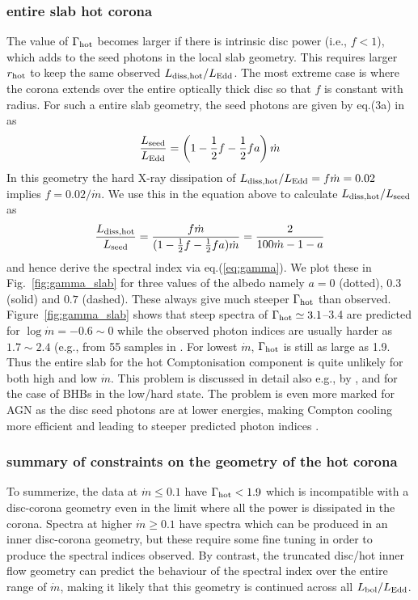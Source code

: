 \documentclass[a4paper,fleqn,usenatbib]{mnras}
\begin{document}
\subsubsection{entire slab hot corona}
The value of $\Gamma_{\rm hot}$ becomes larger if there is  intrinsic disc power (i.e., $f<1$), which adds to the seed photons
in the local slab geometry. This requires larger 
$r_{\rm hot}$  to keep the same 
observed $L_{\rm diss, hot}/L_{\rm Edd}$.%
The most extreme case is where the corona extends over the entire optically thick disc
so that $f$ is constant with radius. 
For such a entire slab geometry, 
the seed photons are given by  eq.(3a) in  \cite{haardt1993} as
\[
\frac{L_{\rm seed}}{L_{\rm Edd}}= \left(1-\frac{1}{2}f-\frac{1}{2}fa\right)\dot{m}
\]
In this geometry the  hard X-ray dissipation of  $L_{\rm diss,hot}/L_{\rm Edd}=f\dot{m}=0.02$ 
implies $f=0.02/\dot{m}$. We use this in the equation above to
calculate $L_{\rm diss, hot}/L_{\rm seed}$ as 
\[
\frac{L_{\rm diss,hot}}{L_{\rm seed}}=\frac{f\dot{m}}{ (1-\frac{1}{2}f-\frac{1}{2}fa)\dot{m}}=\frac{2}{100\dot{m}-1-a}
\]
and hence derive the spectral index via eq.(\ref{eq:gamma}).
We plot these in Fig.~\ref{fig:gamma_slab} for three values of the
albedo namely $a=0$ (dotted), $0.3$ (solid) and $0.7$
(dashed).  These always give much steeper $\Gamma_{\rm hot}$ than observed. 
Figure~\ref{fig:gamma_slab} shows that steep spectra of $\Gamma_{\rm hot}\simeq 3.1$--3.4 
are predicted for $\log \dot{m}=-0.6\sim0$ while the observed photon indices are usually harder as 
$1.7\sim 2.4$ (e.g., from 55 samples in \cite{jin2012a}.
For lowest $\dot{m}$, $\Gamma_{\rm hot}$ is still as large as 1.9.
Thus the entire slab for the hot Comptonisation component is quite unlikely for both high and low $\dot{m}$.
This problem is discussed in detail also e.g., 
by \cite{stern1995}, \cite{malzac2005} and \cite{poutanen2017} for the case of BHBs in the low/hard state. 
The problem is even more marked for AGN as the disc seed
photons are at lower energies, making Compton cooling more efficient
and leading to steeper predicted photon indices \citep{haardt1993}.


\subsubsection{summary of constraints on the geometry of the hot corona}
To summerize, the data at $\dot{m}\le 0.1$ have $\Gamma_{\rm hot} <1.9$ which
is incompatible with a disc-corona geometry even in the limit where all the power is dissipated in the corona. Spectra at higher $\dot{m}\ge 0.1$ have spectra which can be produced in an inner disc-corona geometry, but these require some fine tuning in order to produce the spectral indices observed.
By contrast, the truncated disc/hot inner flow geometry can predict
the behaviour of the spectral index over the entire range of $\dot{m}$,
making it likely that this geometry is continued across all $L_{\rm bol}/L_{\rm Edd}$.
\end{document}
